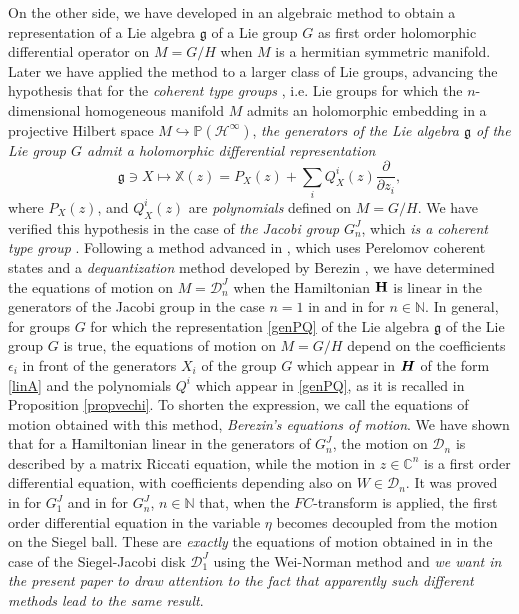 \documentclass[12pt]{amsart}
\numberwithin{equation}{section}
\theoremstyle{definition}
\begin{document}
On the other side, we have developed in \cite{sbcag,sbl}  an algebraic  method to obtain a
representation of a Lie algebra  ${{\mathfrak{{g}}}}$ of a Lie group $G$ as first
order holomorphic differential operator  on $M=G/H$  when
$M$ is a hermitian symmetric manifold. Later we have applied    the method
to a larger class of Lie groups, advancing the hypothesis that for the
{\it coherent type groups} \cite{lis,neeb}, i.e. Lie groups for which
the $n$-dimensional homogeneous manifold $M$ admits an holomorphic embedding in a
projective Hilbert space $M\hookrightarrow{\ensuremath{{\ensuremath{\mathbb{P}}} ({\ensuremath{\mathcal{H}^{\infty}}} )}}$,  {\it the  generators of
the Lie algebra ${{\mathfrak{{g}}}}$ of the Lie group $G$ admit a  
holomorphic differential representation} 
\begin{equation}\label{genPQ}
{{\mathfrak{{g}}}}\ni X \mapsto {{\mathbb{{X}}}}(z)=P_X(z) +\sum_iQ^i_X(z)\frac{\partial}{{\partial}
  z_i}, \end{equation} 
where  $P_X(z)$, and $Q^i_X(z)$ are {\it polynomials} defined on
$M=G/H$. We have verified \cite{jac1,sbj,nou} this hypothesis in the
case of {\it the Jacobi
group} $G^J_n$,  which {\it  is a  coherent type group}
\cite{neeb,ber14}. Following a method advanced in \cite{sbcag,sbl}, 
which uses  Perelomov coherent states \cite{perG} and a {\it
  dequantization} method developed by Berezin \cite{berezin2,berezin1}, we have determined the
equations of motion on $M={{\mathcal{{D}}}}^J_n$ when the Hamiltonian $\bf{H}$ is linear
in the generators of the Jacobi group in the case $n=1$ in  
\cite{jac1,FC} and in \cite{nou} for $n\in{\ensuremath{\mathbb{N}}}$. In general, for groups $G$  for which the representation \eqref{genPQ}  of the Lie algebra
  ${{\mathfrak{{g}}}}$  of the Lie group $G$ is true, the equations of motion on $M=G/H$
depend on the
coefficients $\epsilon_i$ in front of the generators $X_i$ of the group  $G$  which
appear  in  ${{\mbox{\boldmath{${H}$}}}}$ of the form \eqref{linA}  and the
polynomials $Q^i$ which appear in \eqref{genPQ},  as it  is recalled in
Proposition \ref{propvechi}.  To shorten the expression, we call the
equations of motion obtained with this method,  {\it Berezin's
  equations of motion}. We have shown that  for
a Hamiltonian  linear in the generators of $G^J_n$, the motion on
${{\mathcal{{D}}}}_n$ is described by a matrix Riccati equation, while the motion
in $z\in{\ensuremath{\mathbb{C}}}^n$ is a first order differential equation, with coefficients
depending also on $W\in{{\mathcal{{D}}}}_n$. It was proved in \cite{FC}  for
$G^J_1$ and in 
\cite{nou} for $G^J_n$, $n\in{\ensuremath{\mathbb{N}}}$ that, when the $FC$-transform is applied, the
first order differential equation in the variable $\eta$ becomes
decoupled from the motion on the Siegel ball.   These are {\it  exactly} the
equations of motion obtained in  \cite{cezar}  in the case of the
Siegel-Jacobi disk ${{\mathcal{{D}}}}^J_1$ using the Wei-Norman method and {\it we
want in the present paper to draw attention to    the fact that
apparently such different methods lead to  the same result}. 
\end{document}
